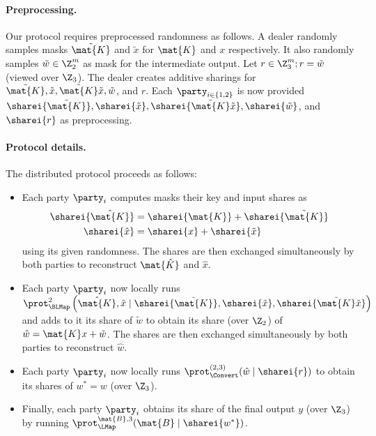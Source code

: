 \paragraph{Preprocessing.}
Our protocol requires preprocessed randomness as follows. A dealer randomly samples masks $\tilde{\mat{K}}$ and $\tilde{x}$ for $\mat{K}$ and $x$ respectively. It also randomly samples $\tilde{w} \in \Z_2^m$ as mask for the intermediate output. Let $r \in \Z_3^m; r = \tilde{w}$ (viewed over $\Z_3$). The dealer creates additive sharings for $\tilde{\mat{K}}, \tilde{x}, \tilde{\mat{K}}\tilde{x}, \tilde{w}$, and $r$. Each $\party_{i\in \{1,2\}}$ is now provided $\sharei{\tilde{\mat{K}}}, \sharei{\tilde{x}}, \sharei{\tilde{\mat{K}}\tilde{x}}, \sharei{\tilde{w}}$, and $\sharei{r}$ as preprocessing.

\paragraph{Protocol details.}
The distributed protocol proceeds as follows:
\begin{itemize}
    \item Each party $\party_i$ computes masks their key and input shares as 
    \begin{align*}
    \sharei{\hat{\mat{K}}} &= \sharei{\mat{K}} + \sharei{\tilde{\mat{K}}} \\
    \sharei{\hat{x}} &= \sharei{x} + \sharei{\tilde{x}}
    \end{align*}
    using its given randomness. The shares are then exchanged simultaneously by both parties to reconstruct $\mat{\hat{K}}$ and $\hat{x}$.

    \item Each party $\party_i$ now locally runs $\prot_\BLMap^2 \left(\hat{\mat{K}}, \hat{x} \mid \sharei{\tilde{\mat{K}}}, \sharei{\tilde{x}}, \sharei{\tilde{\mat{K}}\tilde{x}}\right)$ and adds to it its share of $\tilde{w}$ to obtain its share (over $\Z_2$) of $\hat{w} = \mat{K}x + \tilde{w}$. The shares are then exchanged simultaneously by both parties to reconstruct $\hat{w}$.

    \item Each party $\party_i$ now locally runs $\prot_{\Convert}^{(2,3)}(\hat{w} \mid \sharei{r})$ to obtain its shares of $w^* = w$ (over $\Z_3$).

    \item Finally, each party $\party_i$ obtains its share of the final output $y$ (over $\Z_3$) by running $\prot_\LMap^{\mat{B}, 3}(\mat{B} \mid \sharei{w^*})$.
\end{itemize}



